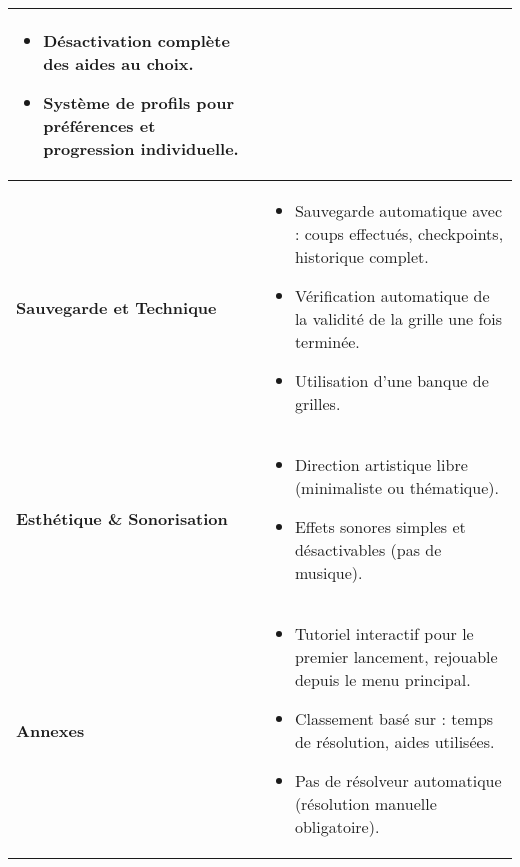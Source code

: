 \begin{longtable}{|p{3.5cm}|p{12cm}|}
\begin{itemize}
    \item Désactivation complète des aides au choix.
    \item Système de profils pour préférences et progression individuelle.
\end{itemize} \\
\hline
\textbf{Sauvegarde et \newline Technique} & 
\begin{itemize}
    \item Sauvegarde automatique avec : coups effectués, checkpoints, historique complet.
    \item Vérification automatique de la validité de la grille une fois terminée.
    \item Utilisation d'une banque de grilles.
\end{itemize} \\
\hline
\textbf{Esthétique \& \newline Sonorisation} & 
\begin{itemize}
    \item Direction artistique libre (minimaliste ou thématique).
    \item Effets sonores simples et désactivables (pas de musique).
\end{itemize} \\
\hline
\textbf{Annexes} & 
\begin{itemize}
    \item Tutoriel interactif pour le premier lancement, rejouable depuis le menu principal.
    \item Classement basé sur : temps de résolution, aides utilisées.
    \item Pas de résolveur automatique (résolution manuelle obligatoire).
\end{itemize} \\
\hline
\end{longtable}
